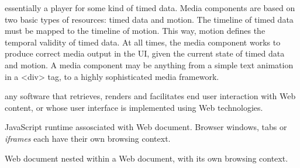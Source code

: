 essentially a player for some kind of timed data. Media components are based
on two basic types of resources: timed data and motion. The timeline of timed
data must be mapped to the timeline of motion. This way, motion defines the
temporal validity of timed data. At all times, the media component works to
produce correct media output in the UI, given the current state of timed data
and motion. A media component may be anything from a simple text animation in
a {\textless}div{\textgreater} tag, to a highly sophisticated media framework.



any software that retrieves, renders and facilitates end user interaction with
Web content, or whose user interface is implemented using Web technologies.


JavaScript runtime assosciated with Web document. Browser windows, tabs or
\emph{iframes} each have their own browsing context.


Web document nested within a Web document, with its own browsing context.
